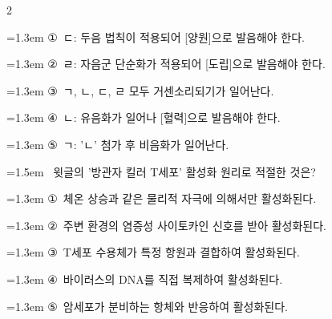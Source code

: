 \documentclass[10pt, a4paper]{article}
\begin{document}
\begin{multicols}{2}
\begin{minipage}{\columnwidth}
\vspace{0.5mm}
{\hangindent=1.3em  \noindent\hspace{0.3em}①~ㄷ: 두음 법칙이 적용되어 [양원]으로 발음해야 한다.\par}
{\hangindent=1.3em  \noindent\hspace{0.3em}②~ㄹ: 자음군 단순화가 적용되어 [도립]으로 발음해야 한다.\par}
{\hangindent=1.3em  \noindent\hspace{0.3em}③~ㄱ, ㄴ, ㄷ, ㄹ 모두 거센소리되기가 일어난다.\par}
{\hangindent=1.3em  \noindent\hspace{0.3em}④~ㄴ: 유음화가 일어나 [혈력]으로 발음해야 한다.\par}
{\hangindent=1.3em  \noindent\hspace{0.3em}⑤~ㄱ: 'ㄴ' 첨가 후 비음화가 일어난다.\par}
\vspace{4mm}
\end{minipage}
\par

\noindent\begin{minipage}{\columnwidth}
\vspace{2mm}
{\hangindent=1.5em  ~윗글의 '방관자 킬러 T세포' 활성화 원리로 적절한 것은?\par}

\vspace{0.5mm}
{\hangindent=1.3em  \noindent\hspace{0.3em}①~체온 상승과 같은 물리적 자극에 의해서만 활성화된다.\par}
{\hangindent=1.3em  \noindent\hspace{0.3em}②~주변 환경의 염증성 사이토카인 신호를 받아 활성화된다.\par}
{\hangindent=1.3em  \noindent\hspace{0.3em}③~T세포 수용체가 특정 항원과 결합하여 활성화된다.\par}
{\hangindent=1.3em  \noindent\hspace{0.3em}④~바이러스의 DNA를 직접 복제하여 활성화된다.\par}
{\hangindent=1.3em  \noindent\hspace{0.3em}⑤~암세포가 분비하는 항체와 반응하여 활성화된다.\par}
\vspace{4mm}
\end{minipage}
\par


\end{multicols}
\end{document}
